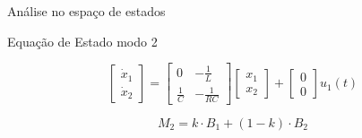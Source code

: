 \documentclass[aspectratio=169]{beamer}
\begin{document}
\begin{frame}{Análise no espaço de estados}

  \begin{block}{Equação de Estado modo 2}
    \begin{center}
      $$\begin{bmatrix} 
        \dot{x}_1 \\ 
        \dot{x}_2 
      \end{bmatrix} = 
      \begin{bmatrix} 
        0 & -\frac{1}{L} \\ 
        \frac{1}{C} & -\frac{1}{RC} 
      \end{bmatrix}
      \begin{bmatrix} 
        x_1 \\ 
        x_2 
      \end{bmatrix} + 
      \begin{bmatrix} 
        0 \\ 
        0  
      \end{bmatrix} u_1(t)$$ 
    \end{center}

    \begin{center}
      $$M_2 = k \cdot B_1 + (1 - k) \cdot B_2$$
    \end{center}
  \end{block}
  
\end{frame}
\end{document}
